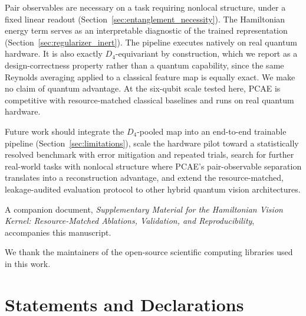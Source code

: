\documentclass[pdflatex,sn-basic]{sn-jnl}
\begin{document}
Pair observables are necessary on a task requiring nonlocal structure,
under a fixed linear
readout
(Section~\ref{sec:entanglement_necessity}). The Hamiltonian energy term serves as
an interpretable diagnostic of the trained representation
(Section~\ref{sec:regularizer_inert}). The pipeline executes natively on real
quantum hardware. It is also exactly $D_4$-equivariant by construction, which we
report as a design-correctness property rather than a quantum capability, since
the same Reynolds averaging applied to a classical feature map is equally exact.
We make no claim of quantum advantage. At the six-qubit scale tested here, PCAE is
competitive with resource-matched classical baselines and runs on real quantum
hardware.

Future work should integrate the $D_4$-pooled map into an end-to-end trainable
pipeline (Section~\ref{sec:limitations}), scale the hardware pilot toward a
statistically resolved benchmark with error mitigation and repeated trials,
search for further real-world tasks with nonlocal structure where PCAE's
pair-observable separation translates into a reconstruction advantage, and
extend the resource-matched, leakage-audited evaluation protocol to other hybrid
quantum vision architectures.

\backmatter


A companion document, \textit{Supplementary Material for the Hamiltonian Vision
Kernel: Resource-Matched Ablations, Validation, and Reproducibility}, accompanies
this manuscript.


We thank the maintainers of the open-source scientific computing libraries used
in this work.

\section*{Statements and Declarations}
\end{document}
